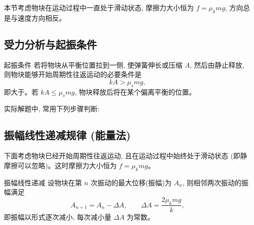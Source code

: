 \documentclass[a4paper,11pt]{ctexart}
\begin{document}
本节考虑物块在运动过程中一直处于滑动状态, 摩擦力大小恒为 $f=\mu_k mg$, 方向总是与速度方向相反。

\subsection{受力分析与起振条件}

\begin{theorembox}{起振条件}
若将物块从平衡位置拉到一侧, 使弹簧伸长或压缩 $A$, 然后由静止释放, 则物块能够开始周期性往返运动的必要条件是
\[
  kA > \mu_s mg,
\]
即大于。若 $kA\le \mu_s mg$, 物块释放后将在某个偏离平衡的位置。
\end{theorembox}

实际解题中, 常用下列步骤判断:

\begin{roadmap}
\end{roadmap}

\subsection{振幅线性递减规律 (能量法)}

下面考虑物块已经开始周期性往返运动, 且在运动过程中始终处于滑动状态 (即静摩擦可以忽略)。这时摩擦力大小恒为 $f=\mu_k mg$。

\begin{theorembox}{振幅线性递减}
设物块在第 $n$ 次振动的最大位移(振幅)为 $A_n$, 则相邻两次振动的振幅满足
\[
  A_{n+1}=A_n-\Delta A,\qquad 
  \Delta A=\dfrac{2\mu_k mg}{k},
\]
即振幅以形式逐次减小, 每次减小量 $\Delta A$ 为常数。
\end{theorembox}
\end{document}
